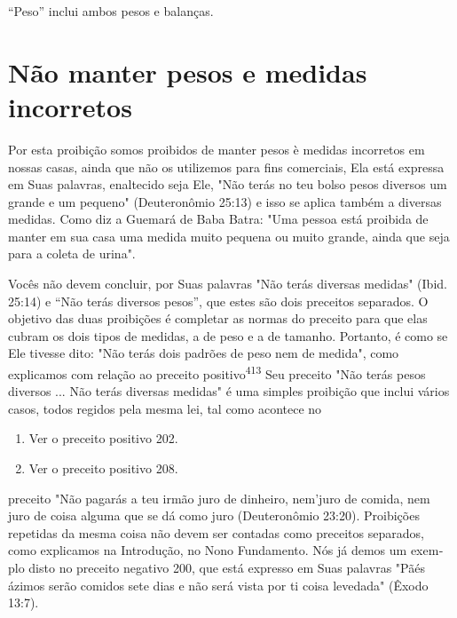 ``Peso'' inclui ambos pesos e balanças.

\section{Não manter pesos e medidas incorretos}

Por esta proibição somos proibidos de manter pesos è medidas in­corretos
em nossas casas, ainda que não os utilizemos para fins comerciais, Ela
está expressa em Suas palavras, enaltecido seja Ele, "Não terás no teu
bolso pe­sos diversos um grande e um pequeno" (Deuteronômio 25:13) e
isso se aplica também a diversas medidas. Como diz a Guemará de Baba
Batra: "Uma pessoa está proibida de manter em sua casa uma medida muito
pequena ou muito gran­de, ainda que seja para a coleta de urina".

Vocês não devem concluir, por Suas palavras "Não terás diversas
me­didas" (Ibid. 25:14) e ``Não terás diversos pesos'', que estes são dois
preceitos separados. O objetivo das duas proibições é completar as
normas do preceito para que elas cubram os dois tipos de medidas, a de
peso e a de tamanho. Por­tanto, é como se Ele tivesse dito: "Não terás
dois padrões de peso nem de me­dida", como explicamos com relação ao
preceito positivo\textsuperscript{413} Seu preceito "Não terás pesos
diversos ... Não terás diversas medidas" é uma simples proibi­ção que
inclui vários casos, todos regidos pela mesma lei, tal como acontece no


\begin{enumerate}
\def\labelenumi{\arabic{enumi}.}
\setcounter{enumi}{411}
\item
 
 Ver o preceito positivo 202.
 
\item
 
 Ver o preceito positivo 208.
 
\end{enumerate}



preceito "Não pagarás a teu irmão juro de dinheiro, nem'juro de comida,
nem juro de coisa alguma que se dá como juro (Deuteronômio 23:20).
Proibições repetidas da mesma coisa não devem ser contadas como
preceitos separados, como explicamos na Introdução, no Nono Fundamento.
Nós já demos um exem­plo disto no preceito negativo 200, que está
expresso em Suas palavras "Pãés ázimos serão comidos sete dias e não
será vista por ti coisa levedada" (Êxodo 13:7).

